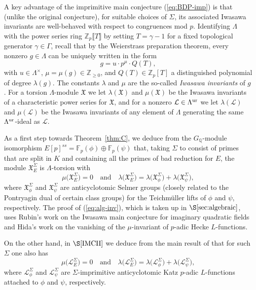 \documentclass[10pt]{amsart}
\numberwithin{equation}{section}
\theoremstyle{definition}
\theoremstyle{remark}
\newcommand{\Z}{\mathbb{Z}}
\newcommand{\Lcal}{\mathcal{L}}
\newcommand{\Q}{\mathbb{Q}}
\begin{document}
A key advantage of the imprimitive main conjecture (\ref{eq:BDP-imp}) is that (unlike the original conjecture), for suitable choices of $\Sigma$, its associated Iwasawa invariants are well-behaved with respect to congruences mod $p$. Identifying $\Lambda$ with the power series ring $\Z_p\llbracket T\rrbracket$ by setting $T=\gamma-1$ for a fixed topological generator $\gamma\in\Gamma$, recall that by the Weierstrass preparation theorem, 
every nonzero $g\in\Lambda$ can be uniquely written in the form
\[
g=u\cdot p^\mu\cdot Q(T),
\]
with $u\in\Lambda^\times$, $\mu=\mu(g)\in\Z_{\geqslant 0}$, and $Q(T)\in\Z_p[T]$ a distinguished polynomial of degree $\lambda(g)$. The constants $\lambda$ and $\mu$ are the so-called \emph{Iwasawa invariants} of $g$. For a torsion $\Lambda$-module $\mathfrak{X}$ we let $\lambda(\mathfrak{X})$ and $\mu(\mathfrak{X})$ be the Iwasawa invariants of a characteristic power series for $\mathfrak{X}$, and for a nonzero $\mathcal{L}\in\Lambda^{\rm ur}$ we let $\lambda(\Lcal)$ and $\mu(\Lcal)$ be the Iwasawa invariants of any element of $\Lambda$ generating the same $\Lambda^{\rm ur}$-ideal as $\mathcal{L}$. 

As a first step towards Theorem~\ref{thm:C}, we deduce from the $G_\Q$-module isomorphism $E[p]^{ss}=\mathbb{F}_p(\phi)\oplus\mathbb{F}_p(\psi)$ that, taking $\Sigma$ to consist of primes that are split in $K$ and containing all the primes of bad reduction for $E$, the module $\mathfrak{X}_E^\Sigma$ is $\Lambda$-torsion with
\begin{equation}\label{eq:alg-inv}
\mu\bigl(\mathfrak{X}_E^\Sigma\bigr)=0\quad\textrm{and}\quad\lambda\bigl(\mathfrak{X}_E^\Sigma\bigr)=\lambda\bigl(\mathfrak{X}_\phi^\Sigma\bigr)+\lambda\bigl(\mathfrak{X}_\psi^\Sigma\bigr),
\end{equation}
where $\mathfrak{X}_\phi^\Sigma$ and $\mathfrak{X}_\psi^\Sigma$ are anticyclotomic Selmer groups (closely related to the Pontryagin dual of certain class groups) for the Teichm\"uller lifts of $\phi$ and $\psi$, respectively. The proof of (\ref{eq:alg-inv}), which is taken up in $\S\ref{sec:algebraic}$, uses Rubin's work \cite{rubinmainconj} on the Iwasawa main conjecture for imaginary quadratic fields and Hida's work \cite{hidamu=0} on the vanishing of the $\mu$-invariant of $p$-adic Hecke $L$-functions. 

On the other hand, in $\S\ref{IMCII}$ we deduce from the main result of \cite{kriz} that for such $\Sigma$ one also has
\begin{equation}\label{eq:an-inv}
\mu\bigl(\Lcal_E^\Sigma\bigr)=0\quad\textrm{and}\quad\lambda\bigl(\Lcal_E^\Sigma\bigr)=\lambda\bigl(\Lcal_\phi^\Sigma\bigr)+\lambda\bigl(\Lcal_\psi^\Sigma\bigr),
\end{equation}
where $\mathcal{L}_\phi^\Sigma$ and $\Lcal_\psi^\Sigma$ are $\Sigma$-imprimitive anticyclotomic Katz $p$-adic $L$-functions attached to $\phi$ and $\psi$, respectively. 
\end{document}
